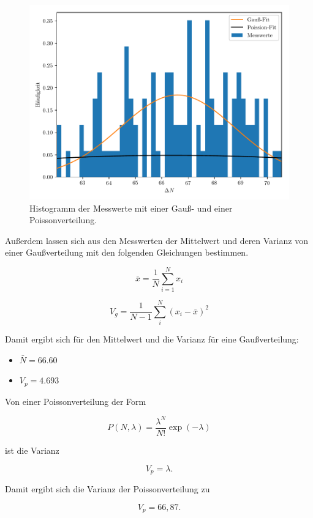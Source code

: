 \begin{figure}[H]
  \centering
  \includegraphics{plot5.pdf}
  \caption{Histogramm der Messwerte mit einer Gauß- und einer Poissonverteilung.}
  \label{abb:6}
\end{figure}

Außerdem lassen sich aus den Messwerten der Mittelwert und deren Varianz von einer
Gaußverteilung mit den folgenden Gleichungen bestimmen.

\begin{equation*}
    \bar{x} = \frac{1}{N} \sum_{i=1}^{N} x_i
\end{equation*}

\begin{equation*}
  V_g = \frac{1}{N-1} \sum_{i}^{N}(x_i-\bar{x})^2
\end{equation*}

Damit ergibt sich für den Mittelwert und die Varianz für eine Gaußverteilung:

\begin{itemize}
  \item $\bar{N} = \num{66.60}$
  \item $V_p = \num{4.693}$
\end{itemize}

Von einer Poissonverteilung der Form

\begin{equation*}
  P(N, \lambda) = \frac{\lambda^N}{N!} \exp{(-\lambda)}
\end{equation*}

ist die Varianz

\begin{equation*}
  V_p = \lambda.
\end{equation*}

Damit ergibt sich die Varianz der Poissonverteilung zu

\begin{equation*}
  V_p = 66,87.
\end{equation*}
